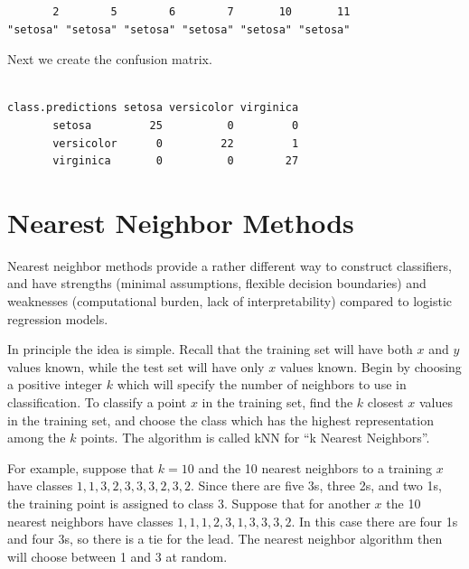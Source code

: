 \documentclass[
]{krantz}
\makeatletter
\newenvironment{Shaded}{\begin{snugshade}}{\end{snugshade}}
\newcommand{\KeywordTok}[1]{\textcolor[rgb]{0.27,0.27,0.27}{\textbf{#1}}}
\newcommand{\NormalTok}[1]{#1}
\newcommand{\OperatorTok}[1]{\textcolor[rgb]{0.43,0.43,0.43}{\textbf{#1}}}
\newcommand{\StringTok}[1]{\textcolor[rgb]{0.5,0.5,0.5}{#1}}
\newenvironment{kframe}{%
\medskip{}
\setlength{\fboxsep}{.8em}
 \def\at@end@of@kframe{}%
 \ifinner\ifhmode%
  \def\at@end@of@kframe{\end{minipage}}%
  \begin{minipage}{\columnwidth}%
 \fi\fi%
 \def\FrameCommand##1{\hskip\@totalleftmargin \hskip-\fboxsep
 \colorbox{shadecolor}{##1}\hskip-\fboxsep
     \hskip-\linewidth \hskip-\@totalleftmargin \hskip\columnwidth}%
 \MakeFramed {\advance\hsize-\width
   \@totalleftmargin\z@ \linewidth\hsize
   \@setminipage}}%
 {\par\unskip\endMakeFramed%
 \at@end@of@kframe}
\renewenvironment{Shaded}{\begin{kframe}}{\end{kframe}}
\makeatother
\begin{document}
\begin{verbatim}
       2        5        6        7       10       11 
"setosa" "setosa" "setosa" "setosa" "setosa" "setosa" 
\end{verbatim}

Next we create the confusion matrix.

\begin{Shaded}
\end{Shaded}

\begin{verbatim}
                 
class.predictions setosa versicolor virginica
       setosa         25          0         0
       versicolor      0         22         1
       virginica       0          0        27
\end{verbatim}

\hypertarget{nearest-neighbor-methods}{%
\section{Nearest Neighbor Methods}\label{nearest-neighbor-methods}}

Nearest neighbor methods provide a rather different way to construct classifiers, and have strengths (minimal assumptions, flexible decision boundaries) and weaknesses (computational burden, lack of interpretability) compared to logistic regression models.

In principle the idea is simple. Recall that the training set will have both \(x\) and \(y\) values known, while the test set will have only \(x\) values known. Begin by choosing a positive integer \(k\) which will specify the number of neighbors to use in classification. To classify a point \(x\) in the training set, find the \(k\) closest \(x\) values in the training set, and choose the class which has the highest representation among the \(k\) points. The algorithm is called kNN for ``k Nearest Neighbors''.

For example, suppose that \(k=10\) and the 10 nearest neighbors to a training \(x\) have classes \(1, 1, 3, 2, 3, 3, 3, 2, 3, 2\). Since there are five 3s, three 2s, and two 1s, the training point is assigned to class 3. Suppose that for another \(x\) the 10 nearest neighbors have classes \(1,1,1,2,3,1,3,3,3,2\). In this case there are four 1s and four 3s, so there is a tie for the lead. The nearest neighbor algorithm then will choose between 1 and 3 at random.
\end{document}
